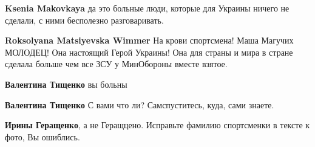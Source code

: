 \begin{itemize}
\begin{itemize}
\begin{itemize}
 
\textbf{Ksenia Makovkaya} да это больные люди, которые для Украины ничего не сделали, с ними бесполезно разговаривать.

 
\textbf{Roksolyana Matsiyevska Wimmer} На крови спортсмена! Маша Магучих
МОЛОДЕЦ! Она настоящий Герой Украины! Она для страны и мира в стране сделала
больше чем все ЗСУ у МинОбороны вместе взятое.
\end{itemize}

 
\textbf{Валентина Тищенко} вы больны

 
\textbf{Валентина Тищенко} С вами что ли? Самспуститесь, куда, сами знаете.

\end{itemize}


 
\textbf{Ирины Геращенко}, а не Геращцено. Исправьте фамилию спортсменки в тексте к фото, Вы ошиблись.

\begin{itemize}
 

\end{itemize}
\end{itemize}
